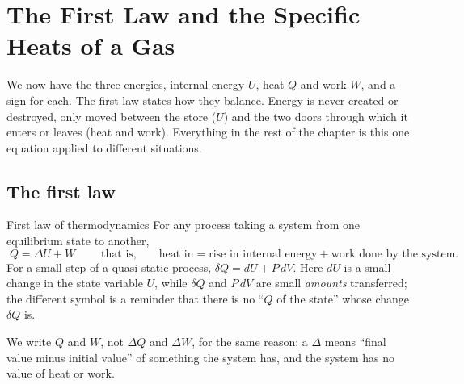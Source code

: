 \section{The First Law and the Specific Heats of a Gas}\label{sec:firstlaw}

We now have the three energies, internal energy $U$, heat $Q$ and work $W$, and a sign for each. The
first law states how they balance. Energy is never created or destroyed, only moved between the store
($U$) and the two doors through which it enters or leaves (heat and work). Everything in the rest of the
chapter is this one equation applied to different situations.

\subsection{The first law}

\begin{keybox}{First law of thermodynamics}\label{key:firstlaw}
For any process taking a system from one equilibrium state to another,
\[
\boxed{\;Q=\Delta U+W\;}
\qquad\text{that is,}\qquad
\text{heat in} = \text{rise in internal energy}+\text{work done by the system}.
\]
For a small step of a quasi-static process, $\delta Q=dU+P\,dV$. Here $dU$ is a small change in the
state variable $U$, while $\delta Q$ and $P\,dV$ are small \emph{amounts} transferred; the different
symbol is a reminder that there is no ``$Q$ of the state'' whose change $\delta Q$ is.
\end{keybox}

We write $Q$ and $W$, not $\Delta Q$ and $\Delta W$, for the same reason: a $\Delta$ means ``final value
minus initial value'' of something the system has, and the system has no value of heat or work.



